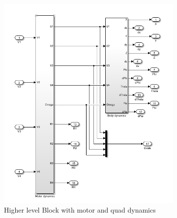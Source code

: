 \documentclass[conf]{new-aiaa}
\begin{document}
\begin{doublespace}
\begin{figure}[!h]
\centering
\begin{subfigure}{.33\textwidth}
  \centering
  \includegraphics[scale= 0.3]{dynam.png}
  \caption{Higher level Block with motor and quad dynamics}
  \label{dynam}
\end{subfigure}%
\begin{subfigure}{.33\textwidth}
  \centering

\end{subfigure}
\end{figure}
\end{doublespace}
\end{document}
